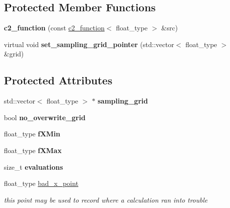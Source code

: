 \subsection*{Protected Member Functions}
\begin{DoxyCompactItemize}
\item 
\hypertarget{classc2__function_a0dcc0aa8129ea37e46a72bcafd5d1dc3}{{\bfseries c2\-\_\-function} (const \hyperlink{classc2__function}{c2\-\_\-function}$<$ float\-\_\-type $>$ \&src)}\label{classc2__function_a0dcc0aa8129ea37e46a72bcafd5d1dc3}

\item 
\hypertarget{classc2__function_af06d3b95c044d5ece8343badec919d17}{virtual void {\bfseries set\-\_\-sampling\-\_\-grid\-\_\-pointer} (std\-::vector$<$ float\-\_\-type $>$ \&grid)}\label{classc2__function_af06d3b95c044d5ece8343badec919d17}

\end{DoxyCompactItemize}
\subsection*{Protected Attributes}
\begin{DoxyCompactItemize}
\item 
\hypertarget{classc2__function_ad9714faf2c3d053a77fd733b52834754}{std\-::vector$<$ float\-\_\-type $>$ $\ast$ {\bfseries sampling\-\_\-grid}}\label{classc2__function_ad9714faf2c3d053a77fd733b52834754}

\item 
\hypertarget{classc2__function_a12085ddfc5716c442bb59c5672e140dd}{bool {\bfseries no\-\_\-overwrite\-\_\-grid}}\label{classc2__function_a12085ddfc5716c442bb59c5672e140dd}

\item 
\hypertarget{classc2__function_a72d60216e8a9c61039d4895c6a15b0ce}{float\-\_\-type {\bfseries f\-X\-Min}}\label{classc2__function_a72d60216e8a9c61039d4895c6a15b0ce}

\item 
\hypertarget{classc2__function_a8d000a2d3ca13a119f4bcf4e31a9bca6}{float\-\_\-type {\bfseries f\-X\-Max}}\label{classc2__function_a8d000a2d3ca13a119f4bcf4e31a9bca6}

\item 
\hypertarget{classc2__function_a0737663eb36818cd357852479e6b96f2}{size\-\_\-t {\bfseries evaluations}}\label{classc2__function_a0737663eb36818cd357852479e6b96f2}

\item 
\hypertarget{classc2__function_a19b31dd52b778a2fe5f156def38e41d4}{float\-\_\-type \hyperlink{classc2__function_a19b31dd52b778a2fe5f156def38e41d4}{bad\-\_\-x\-\_\-point}}\label{classc2__function_a19b31dd52b778a2fe5f156def38e41d4}

\begin{DoxyCompactList}\small\item\em this point may be used to record where a calculation ran into trouble \end{DoxyCompactList}\end{DoxyCompactItemize}


